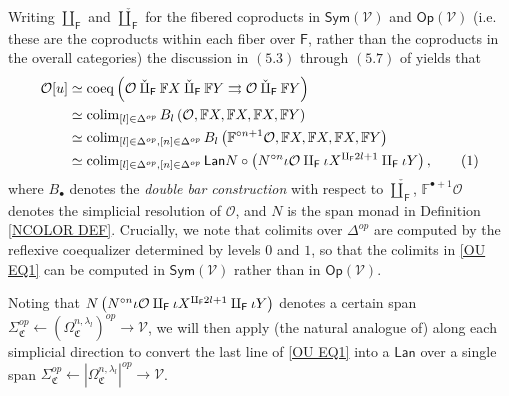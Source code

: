 \documentclass[a4paper,10pt
,draft
]{article}%
\renewcommand{\hat}{\widehat}
\renewcommand{\1}{\eta}%
\begin{document}
Writing $\amalg_{\mathsf{F}}$ and $\mathbin{\check\amalg}_{\mathsf{F}}$
for the fibered coproducts in 
$\mathsf{Sym}(\mathcal{V})$ and
$\mathsf{Op}(\mathcal{V})$
(i.e. these are the coproducts within each fiber over $\mathsf{F}$, rather than the coproducts in the overall categories)
the discussion in $(5.3)$ through $(5.7)$ of \cite{BP_geo}
yields that
\begin{align*}
  \O[u]
  &
    \simeq \mathrm{coeq}\left(
          \O \mathbin{\check\amalg_{\mathsf{F}}} \mathbb F X \mathbin{\check\amalg}_{\mathsf{F}} \mathbb F Y \rightrightarrows \O \mathbin{\check\amalg}_{\mathsf{F}} \mathbb F Y
          \right)
  \\
  &
    \simeq \colim_{[l] \in \Delta^{op}} 
    B_l \left( \O, \mathbb F X, \mathbb F X, \mathbb F X, \mathbb FY \right)
  \\
  &
    \simeq \colim_{[l] \in \Delta^{op},[n] \in \Delta^{op}} 
    B_l \left( \mathbb F^{\circ n+1} \O, \mathbb F X, \mathbb F X, \mathbb F X, \mathbb FY \right)
  \\
  &
    \simeq \colim_{[l] \in \Delta^{op},[n] \in \Delta^{op}} 
    \mathsf{Lan} N \circ \left( N^{\circ n} \iota \O \amalg_{\mathsf{F}} \iota X^{\amalg_{\mathsf{F}} 2l +1} \amalg_{\mathsf{F}} \iota Y \right),
    \stepcounter{equation}\tag{\theequation}\label{OU EQ1}
\end{align*}
where $B_{\bullet}$ denotes the \textit{double bar construction}
with respect to $\mathbin{\check\amalg}_{\mathsf{F}}$,
$\mathbb{F}^{\bullet +1} \mathcal{O}$ denotes the simplicial resolution of $\mathcal{O}$, 
and $N$ is the span monad in Definition \ref{NCOLOR DEF}.
Crucially, we note that colimits over $\Delta^{op}$
are computed by the reflexive coequalizer determined by levels $0$ and $1$, 
so that the colimits in \eqref{OU EQ1}
can be computed in $\mathsf{Sym}(\mathcal{V})$
rather than in $\mathsf{Op}(\mathcal{V})$.


Noting that $N \left(N^{\circ n} \iota \mathcal{O} \amalg_{\mathsf{F}} \iota X^{\amalg_{\mathsf{F}} 2l +1}\amalg_{\mathsf{F}} \iota Y \right)$ denotes a certain span
$\Sigma_{\mathfrak{C}}^{op} \leftarrow 
\left(\Omega^{n,\lambda_l}_{\mathfrak{C}}\right)^{op} \to \mathcal{V}$,
we will then apply (the natural analogue of)
\cite[Prop. 5.37]{BP_geo}
along each simplicial direction
to convert the last line of \eqref{OU EQ1}
into a $\mathsf{Lan}$
over a single span
$\Sigma_{\mathfrak{C}}^{op} \leftarrow 
\left|\Omega^{n,\lambda_l}_{\mathfrak{C}}\right|^{op} \to \mathcal{V}$.
\end{document}
